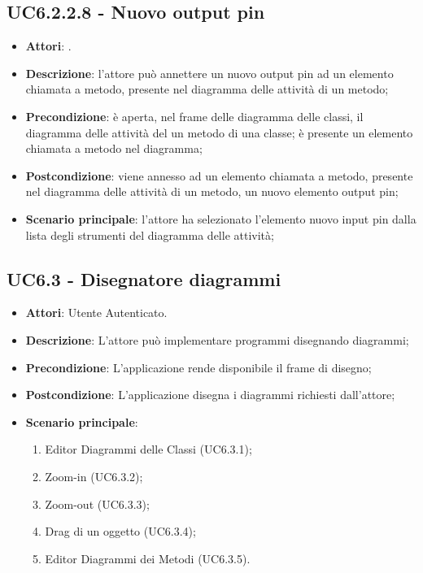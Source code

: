 \subsection{UC6.2.2.8 - Nuovo output pin} 
\label{ssec:UC6.2.2.8} 
\begin{itemize} 
\item \textbf{Attori}: .
\item \textbf{Descrizione}: l'attore può annettere un nuovo output pin ad un elemento chiamata a metodo, presente nel diagramma delle attività di un metodo;
\item \textbf{Precondizione}: è aperta, nel frame delle diagramma delle  classi, il diagramma delle attività del un metodo di una classe; è presente un elemento chiamata a metodo nel diagramma;
\item \textbf{Postcondizione}: viene annesso ad un elemento chiamata a metodo, presente nel diagramma delle attività di un metodo, un nuovo elemento output pin;
\item \textbf{Scenario principale}: l'attore ha selezionato l'elemento nuovo input pin dalla lista degli strumenti del diagramma delle attività;\end{itemize} 
\subsection{UC6.3 - Disegnatore diagrammi} 
\label{ssec:UC6.3} 
\begin{itemize} 
\item \textbf{Attori}: Utente Autenticato.
\item \textbf{Descrizione}: L'attore può implementare programmi disegnando diagrammi;
\item \textbf{Precondizione}: L'applicazione rende disponibile il frame di disegno;
\item \textbf{Postcondizione}: L'applicazione disegna i diagrammi richiesti dall'attore;
\item \textbf{Scenario principale}: \begin{enumerate}\item Editor Diagrammi delle Classi (UC6.3.1);\item Zoom-in (UC6.3.2);\item Zoom-out (UC6.3.3);\item Drag di un oggetto (UC6.3.4);\item Editor Diagrammi dei Metodi (UC6.3.5). 
 \end{enumerate}
\end{itemize} 
